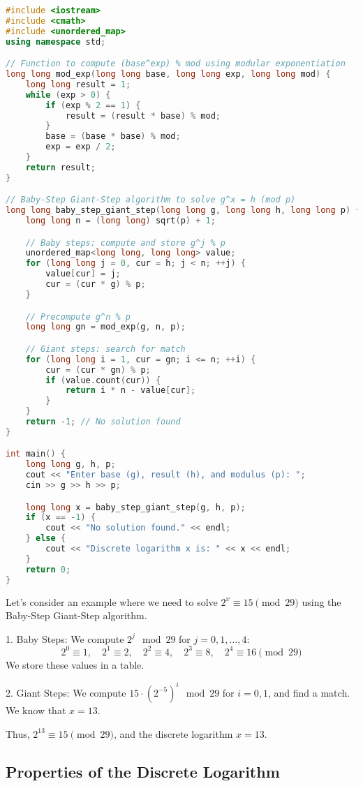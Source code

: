 \documentclass[10pt,a4paper]{article}
\begin{document}
\begin{lstlisting}[language=C++]
#include <iostream>
#include <cmath>
#include <unordered_map>
using namespace std;

// Function to compute (base^exp) % mod using modular exponentiation
long long mod_exp(long long base, long long exp, long long mod) {
    long long result = 1;
    while (exp > 0) {
        if (exp % 2 == 1) {
            result = (result * base) % mod;
        }
        base = (base * base) % mod;
        exp = exp / 2;
    }
    return result;
}

// Baby-Step Giant-Step algorithm to solve g^x = h (mod p)
long long baby_step_giant_step(long long g, long long h, long long p) {
    long long n = (long long) sqrt(p) + 1;

    // Baby steps: compute and store g^j % p
    unordered_map<long long, long long> value;
    for (long long j = 0, cur = h; j < n; ++j) {
        value[cur] = j;
        cur = (cur * g) % p;
    }

    // Precompute g^n % p
    long long gn = mod_exp(g, n, p);

    // Giant steps: search for match
    for (long long i = 1, cur = gn; i <= n; ++i) {
        cur = (cur * gn) % p;
        if (value.count(cur)) {
            return i * n - value[cur];
        }
    }
    return -1; // No solution found
}

int main() {
    long long g, h, p;
    cout << "Enter base (g), result (h), and modulus (p): ";
    cin >> g >> h >> p;

    long long x = baby_step_giant_step(g, h, p);
    if (x == -1) {
        cout << "No solution found." << endl;
    } else {
        cout << "Discrete logarithm x is: " << x << endl;
    }
    return 0;
}
\end{lstlisting}

Let’s consider an example where we need to solve \(2^x \equiv 15 \pmod{29}\) using the Baby-Step Giant-Step algorithm.

1. Baby Steps: We compute \(2^j \mod 29\) for \(j = 0, 1, \dots, 4\):
\[
2^0 \equiv 1, \quad 2^1 \equiv 2, \quad 2^2 \equiv 4, \quad 2^3 \equiv 8, \quad 2^4 \equiv 16 \pmod{29}
\]
We store these values in a table.

2. Giant Steps: We compute \(15 \cdot (2^{-5})^i \mod 29\) for \(i = 0, 1\), and find a match. We know that \(x = 13\).

Thus, \(2^{13} \equiv 15 \pmod{29}\), and the discrete logarithm \(x = 13\).

\subsection*{Properties of the Discrete Logarithm}
\end{document}
